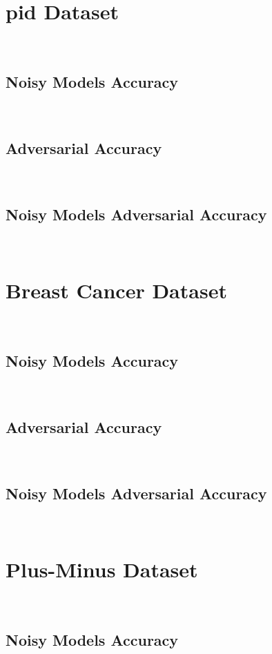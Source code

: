 \section{\acl{pid} Dataset}\label{section:diabetes-eval} \

\subsection{Noisy Models Accuracy}\label{subsection:diabetes-noisy-acc} \

\subsection{Adversarial Accuracy}\label{subsection:diabetes-adv-acc} \

\subsection{Noisy Models Adversarial Accuracy}\label{subsection:diabetes-noisy-adv-acc} \

\section{Breast Cancer Dataset}\label{section:breast-cancer-eval} \

\subsection{Noisy Models Accuracy}\label{subsection:breast-cancer-noisy-acc} \

\subsection{Adversarial Accuracy}\label{subsection:breast-cancer-adv-acc} \

\subsection{Noisy Models Adversarial Accuracy}\label{subsection:breast-cancer-noisy-adv-acc} \

\section{Plus-Minus Dataset}\label{section:plus-minus-cancer-eval} \

\subsection{Noisy Models Accuracy}\label{subsection:plus-minus-cancer-noisy-acc} \

